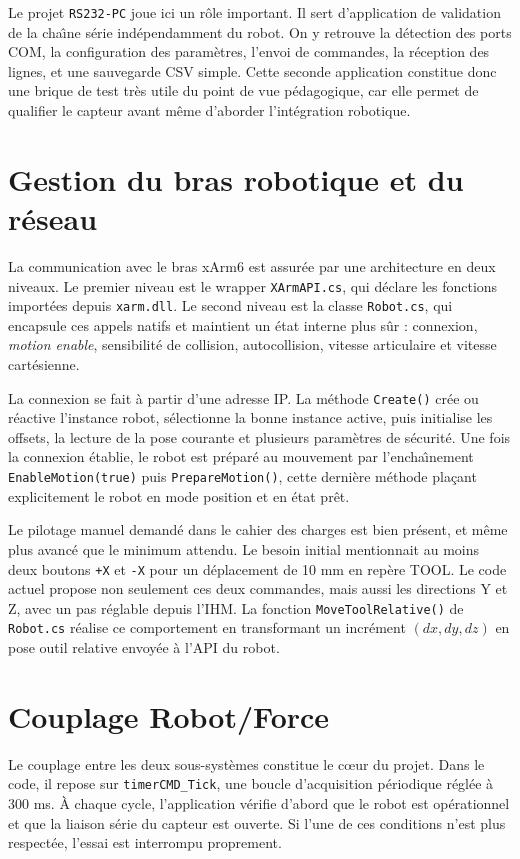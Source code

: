 \documentclass[11pt,a4paper]{article}
\begin{document}
Le projet \texttt{RS232-PC} joue ici un r\^ole important. Il sert d'application de validation de la cha\^\i ne s\'erie ind\'ependamment du robot. On y retrouve la d\'etection des ports COM, la configuration des param\`etres, l'envoi de commandes, la r\'eception des lignes, et une sauvegarde CSV simple. Cette seconde application constitue donc une brique de test tr\`es utile du point de vue p\'edagogique, car elle permet de qualifier le capteur avant m\^eme d'aborder l'int\'egration robotique.

\section{Gestion du bras robotique et du r\'eseau}
\label{sec:robot}
La communication avec le bras xArm6 est assur\'ee par une architecture en deux niveaux. Le premier niveau est le wrapper \texttt{XArmAPI.cs}, qui d\'eclare les fonctions import\'ees depuis \texttt{xarm.dll}. Le second niveau est la classe \texttt{Robot.cs}, qui encapsule ces appels natifs et maintient un \'etat interne plus s\^ur : connexion, \emph{motion enable}, sensibilit\'e de collision, autocollision, vitesse articulaire et vitesse cart\'esienne.

La connexion se fait \`a partir d'une adresse IP. La m\'ethode \texttt{Create()} cr\'ee ou r\'eactive l'instance robot, s\'electionne la bonne instance active, puis initialise les offsets, la lecture de la pose courante et plusieurs param\`etres de s\'ecurit\'e. Une fois la connexion \'etablie, le robot est pr\'epar\'e au mouvement par l'encha\^\i nement \texttt{EnableMotion(true)} puis \texttt{PrepareMotion()}, cette derni\`ere m\'ethode pla\c{c}ant explicitement le robot en mode position et en \'etat pr\^et.

Le pilotage manuel demand\'e dans le cahier des charges est bien pr\'esent, et m\^eme plus avanc\'e que le minimum attendu. Le besoin initial mentionnait au moins deux boutons \texttt{+X} et \texttt{-X} pour un d\'eplacement de 10 mm en rep\`ere TOOL. Le code actuel propose non seulement ces deux commandes, mais aussi les directions Y et Z, avec un pas r\'eglable depuis l'IHM. La fonction \texttt{MoveToolRelative()} de \texttt{Robot.cs} r\'ealise ce comportement en transformant un incr\'ement \((dx,dy,dz)\) en pose outil relative envoy\'ee \`a l'API du robot.

\section{Couplage Robot/Force}
\label{sec:couplage}
Le couplage entre les deux sous-syst\`emes constitue le c\oe ur du projet. Dans le code, il repose sur \texttt{timerCMD\_Tick}, une boucle d'acquisition p\'eriodique r\'egl\'ee \`a 300 ms. \`A chaque cycle, l'application v\'erifie d'abord que le robot est op\'erationnel et que la liaison s\'erie du capteur est ouverte. Si l'une de ces conditions n'est plus respect\'ee, l'essai est interrompu proprement.
\end{document}
